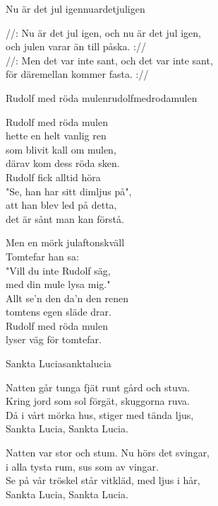 \begin{song}{Nu är det jul igen}{nuardetjuligen}
\begin{vers}
//: Nu är det jul igen, och nu är det jul igen,\\
och julen varar än till påska. ://\\
//: Men det var inte sant, och det var inte sant,\\
för däremellan kommer fasta. ://\\
\end{vers}
\end{song}


\begin{song}{Rudolf med röda mulen}{rudolfmedrodamulen}
\begin{vers}
Rudolf med röda mulen\\
hette en helt vanlig ren\\
som blivit kall om mulen,\\
därav kom dess röda sken.\\
Rudolf fick alltid höra\\
"Se, han har sitt dimljus på",\\
att han blev led på detta,\\
det är sånt man kan förstå.\\
\end{vers}
\begin{vers}
Men en mörk julaftonskväll\\
Tomtefar han sa:\\
"Vill du inte Rudolf säg,\\
med din mule lysa mig."\\
Allt se'n den da'n den renen\\
tomtens egen släde drar.\\
Rudolf med röda mulen\\
lyser väg för tomtefar.\\
\end{vers}
\end{song}

\newpage

\begin{song}{Sankta Lucia}{sanktalucia}
\begin{vers}
Natten går tunga fjät runt gård och stuva.\\
Kring jord som sol förgät, skuggorna ruva.\\
Då i vårt mörka hus, stiger med tända ljus,\\
Sankta Lucia, Sankta Lucia.\\
\end{vers}
\begin{vers}
Natten var stor och stum. Nu hörs det svingar,\\
i alla tysta rum, sus som av vingar.\\
Se på vår tröskel står vitkläd, med ljus i hår,\\
Sankta Lucia, Sankta Lucia.\\
\end{vers}
\end{song}

